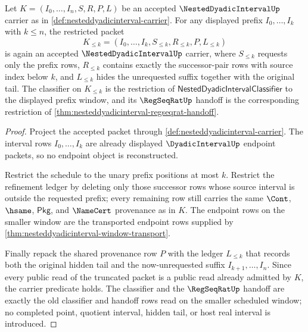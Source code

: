 \begin{theorem}
\label{thm:nesteddyadicinterval-prefix-truncation-stability}
Let $K=(I_0,\ldots,I_n,S,R,P,L)$ be an accepted $\NestedDyadicIntervalUp$ carrier as in \autoref{def:nesteddyadicinterval-carrier}. For any displayed prefix $I_0,\ldots,I_k$ with $k\leq n$, the restricted packet
$$
K_{\leq k}=(I_0,\ldots,I_k,S_{\leq k},R_{\leq k},P,L_{\leq k})
$$
is again an accepted $\NestedDyadicIntervalUp$ carrier, where $S_{\leq k}$ requests only the prefix rows, $R_{\leq k}$ contains exactly the successor-pair rows with source index below $k$, and $L_{\leq k}$ hides the unrequested suffix together with the original tail. The classifier on $K_{\leq k}$ is the restriction of $\mathsf{NestedDyadicIntervalClassifier}$ to the displayed prefix window, and its $\RegSeqRatUp$ handoff is the corresponding restriction of \autoref{thm:nesteddyadicinterval-regseqrat-handoff}.
\end{theorem}
\begin{proof}
Project the accepted packet through \autoref{def:nesteddyadicinterval-carrier}. The interval rows $I_0,\ldots,I_k$ are already displayed $\DyadicIntervalUp$ endpoint packets, so no endpoint object is reconstructed.

Restrict the schedule to the unary prefix positions at most $k$. Restrict the refinement ledger by deleting only those successor rows whose source interval is outside the requested prefix; every remaining row still carries the same $\Cont$, $\hsame$, $\mathsf{Pkg}$, and $\NameCert$ provenance as in $K$. The endpoint rows on the smaller window are the transported endpoint rows supplied by \autoref{thm:nesteddyadicinterval-window-transport}.

Finally repack the shared provenance row $P$ with the ledger $L_{\leq k}$ that records both the original hidden tail and the now-unrequested suffix $I_{k+1},\ldots,I_n$. Since every public read of the truncated packet is a public read already admitted by $K$, the carrier predicate holds. The classifier and the $\RegSeqRatUp$ handoff are exactly the old classifier and handoff rows read on the smaller scheduled window; no completed point, quotient interval, hidden tail, or host real interval is introduced.
\end{proof}

